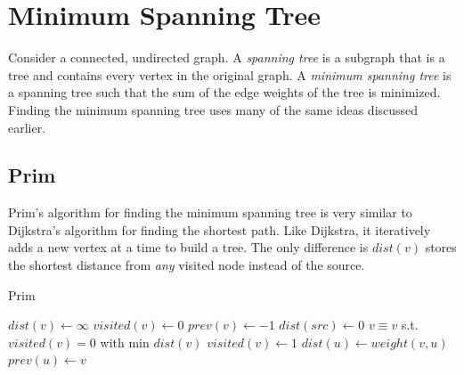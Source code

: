 \documentclass[11pt]{book}
\begin{document}
\section{Minimum Spanning Tree}

Consider a connected, undirected graph. A \textit{spanning tree} is a subgraph that is a tree and contains every vertex in the original graph. A \textit{minimum spanning tree} is a spanning tree such that the sum of the edge weights of the tree is minimized. Finding the minimum spanning tree uses many of the same ideas discussed earlier.

\begin{center}
\end{center}

\subsection{Prim}

Prim's algorithm for finding the minimum spanning tree is very similar to Dijkstra's algorithm for finding the shortest path. Like Dijkstra, it iteratively adds a new vertex at a time to build a tree. The only difference is $dist(v)$ stores the shortest distance from \textit{any} visited node instead of the source.

\begin{algorithm}[H]
\caption{Prim}
\begin{algorithmic}
	\State $dist(v) \gets \infty$
	\State $visited(v) \gets 0$
    \State $prev(v) \gets -1$
\EndFor
\State $dist(src) \gets 0$
	\State $v \equiv v$ s.t. $visited(v)=0$ with min $dist(v)$
    \State $visited(v) \gets 1$
				\State $dist(u) \gets weight(v, u)$
   	        	\State $prev(u) \gets v$
			\EndIf
        \EndIf
    \EndFor
\EndWhile
\end{algorithmic}
\end{algorithm}
\end{document}
